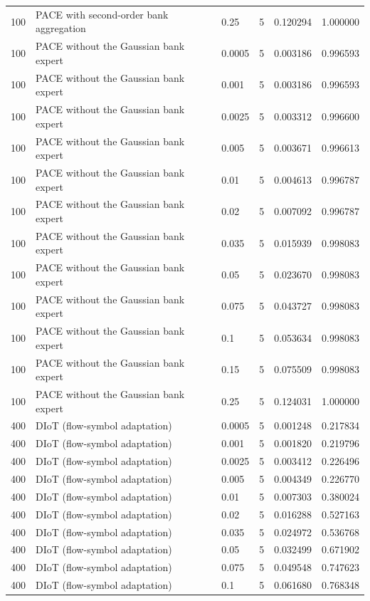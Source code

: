 \begin{tabular}{llllll}
100 & PACE with second-order bank aggregation & 0.25 & 5 & 0.120294 & 1.000000 \\
100 & PACE without the Gaussian bank expert & 0.0005 & 5 & 0.003186 & 0.996593 \\
100 & PACE without the Gaussian bank expert & 0.001 & 5 & 0.003186 & 0.996593 \\
100 & PACE without the Gaussian bank expert & 0.0025 & 5 & 0.003312 & 0.996600 \\
100 & PACE without the Gaussian bank expert & 0.005 & 5 & 0.003671 & 0.996613 \\
100 & PACE without the Gaussian bank expert & 0.01 & 5 & 0.004613 & 0.996787 \\
100 & PACE without the Gaussian bank expert & 0.02 & 5 & 0.007092 & 0.996787 \\
100 & PACE without the Gaussian bank expert & 0.035 & 5 & 0.015939 & 0.998083 \\
100 & PACE without the Gaussian bank expert & 0.05 & 5 & 0.023670 & 0.998083 \\
100 & PACE without the Gaussian bank expert & 0.075 & 5 & 0.043727 & 0.998083 \\
100 & PACE without the Gaussian bank expert & 0.1 & 5 & 0.053634 & 0.998083 \\
100 & PACE without the Gaussian bank expert & 0.15 & 5 & 0.075509 & 0.998083 \\
100 & PACE without the Gaussian bank expert & 0.25 & 5 & 0.124031 & 1.000000 \\
400 & DIoT (flow-symbol adaptation) & 0.0005 & 5 & 0.001248 & 0.217834 \\
400 & DIoT (flow-symbol adaptation) & 0.001 & 5 & 0.001820 & 0.219796 \\
400 & DIoT (flow-symbol adaptation) & 0.0025 & 5 & 0.003412 & 0.226496 \\
400 & DIoT (flow-symbol adaptation) & 0.005 & 5 & 0.004349 & 0.226770 \\
400 & DIoT (flow-symbol adaptation) & 0.01 & 5 & 0.007303 & 0.380024 \\
400 & DIoT (flow-symbol adaptation) & 0.02 & 5 & 0.016288 & 0.527163 \\
400 & DIoT (flow-symbol adaptation) & 0.035 & 5 & 0.024972 & 0.536768 \\
400 & DIoT (flow-symbol adaptation) & 0.05 & 5 & 0.032499 & 0.671902 \\
400 & DIoT (flow-symbol adaptation) & 0.075 & 5 & 0.049548 & 0.747623 \\
400 & DIoT (flow-symbol adaptation) & 0.1 & 5 & 0.061680 & 0.768348 \\

\end{tabular}
